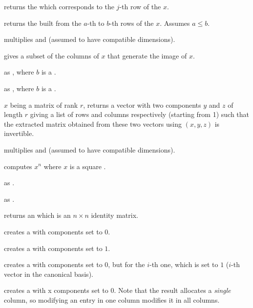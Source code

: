  returns the  which corresponds
to the $j$-th row of the  $x$.

 returns the  built
from the $a$-th to $b$-th rows of the  $x$. Assumes $a \leq b$.

 multiplies   and  (assumed
to have compatible dimensions).

 gives a subset of the columns of $x$ that generate
the image of $x$.



as , where $b$ is a .

as , where $b$ is a .


 $x$ being a matrix of rank $r$, returns a
vector with two  components $y$ and $z$ of length $r$ giving a
list of rows and columns respectively (starting from 1) such that the extracted
matrix obtained from these two vectors using $(x,y,z)$ is
invertible.

 multiplies   and  (assumed to
have compatible dimensions).

 computes $x^n$ where $x$ is a square
.

 as .

 as .

 returns an  which is an $n \times n$
identity matrix.

 creates a  with  components set to
$0$.

 creates a  with  components set to
$1$.

 creates a  with  components
set to $0$, but for the $i$-th one, which is set to $1$ ($i$-th vector in the
canonical basis).

 creates a  with  x 
components set to $0$. Note that the result allocates a
\emph{single} column, so modifying an entry in one column modifies it in
all columns.

